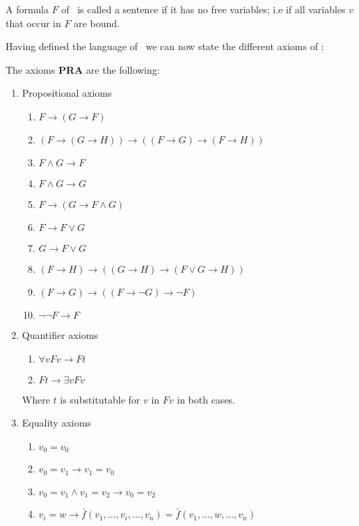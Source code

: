 \documentclass[../main.tex]{subfiles}
\begin{document}
\begin{defi}
	A formula $F$ of \PRA\ is called a sentence if it has no free
	variables; i.e if all variables $v$ that occur in $F$ are bound.
\end{defi}

Having defined the language of \PRA\ we can now state the different axioms of
\PRA:
\begin{defi}
	The axioms \textbf{PRA} are the following:
	\begin{enumerate}
		\item Propositional axioms
			\begin{enumerate}
				\item
					$F\rightarrow( G\rightarrow F)$
				\item
					$(F\rightarrow( G\rightarrow H)
					)\rightarrow((F\rightarrow G)\rightarrow
					(F\rightarrow H))$
				\item $F\wedge G\rightarrow F$
				\item $F\wedge G\rightarrow G$
				\item $F\rightarrow
					( G\rightarrow F\wedge G)$
				\item $F\rightarrow F\vee G$
				\item $ G\rightarrow F\vee G$
				\item
					$(F\rightarrow H)\rightarrow(( G\rightarrow
					 H)\rightarrow(F\vee G\rightarrow H))$
				\item
					$(F\rightarrow
					G)\rightarrow((F\rightarrow\neg G)
					\rightarrow\neg F)$
				\item $\neg\neg F\rightarrow F$
			\end{enumerate}
		\item Quantifier axioms
			\begin{enumerate}
				\item $\forall vF v\rightarrow F t$
				\item $F t\rightarrow \exists v F
					v$
			\end{enumerate}
			Where $t$ is substitutable for $v$ in $F v$ in
			both cases.
		\item Equality axioms
			\begin{enumerate}
				\item $v_0=v_0$
				\item $v_0=v_1\rightarrow v_1=v_0$
				\item $v_0=v_1\wedge v_1=v_2\rightarrow v_0=v_2$
				\item $v_i=w\rightarrow \bar{f}(v_1,\ldots,
					v_i,\ldots,v_n)=\bar{f}(v_1,\ldots,
					w,\ldots,v_n)$

\end{enumerate}
\end{enumerate}
\end{defi}
\end{document}
